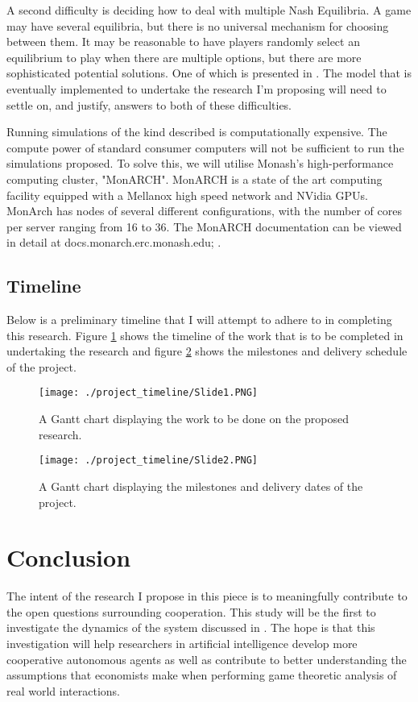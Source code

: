 \documentclass[11pt]{article}
\newcommand*{\np}{\par\noindent\newline}
\begin{document}
\np A second difficulty is deciding how to deal with multiple Nash
Equilibria. A game may have several equilibria, but there is no universal
mechanism for choosing between them. It may be reasonable to have players
randomly select an equilibrium to play when there are multiple options, but
there are more sophisticated potential solutions. One of which is presented in
\cite{binmore_evolutionary_1999}. The model that is eventually implemented to
undertake the research I'm proposing will need to settle on, and
justify, answers to both of these difficulties.

\np Running simulations of the kind described is computationally expensive. The
compute power of standard consumer computers will not be sufficient to run the
simulations proposed. To solve this, we will utilise Monash's high-performance
computing cluster, "MonARCH". MonARCH is a state of the art computing facility
equipped with a Mellanox high speed network and NVidia GPUs. MonArch has nodes
of several different configurations, with the number of cores per server
ranging from 16 to 36. The MonARCH documentation can be viewed in detail at
docs.monarch.erc.monash.edu; \cite{michnowicz_monarch_2018}.
\subsection{Timeline}
Below is a preliminary timeline that I will attempt to adhere to in completing
this research. Figure \ref{fig:main_gantt} shows the timeline of the work that
is to be completed in undertaking the research and figure
\ref{fig:delivery_gantt} shows the milestones and delivery schedule of the
project.
\begin{figure}[!htb]
	\texttt{[image: ./project\_timeline/Slide1.PNG]}
	\caption{A Gantt chart displaying the work to be done on the proposed research.}
	\label{fig:main_gantt}
\end{figure}
\begin{figure}[!htb]
	\texttt{[image: ./project\_timeline/Slide2.PNG]}
	\caption{A Gantt chart displaying the milestones and delivery dates of the project.}
	\label{fig:delivery_gantt}
\end{figure}

\section{Conclusion}
The intent of the research I propose in this piece is to meaningfully
contribute to the open questions surrounding cooperation. This study will be
the first to investigate the dynamics of the system discussed in
\cite{alger_homo_2013}. The hope is that this investigation will help
researchers in artificial intelligence develop more cooperative autonomous
agents as well as contribute to better understanding the assumptions that
economists make when performing game theoretic analysis of real world interactions.



\end{document}
